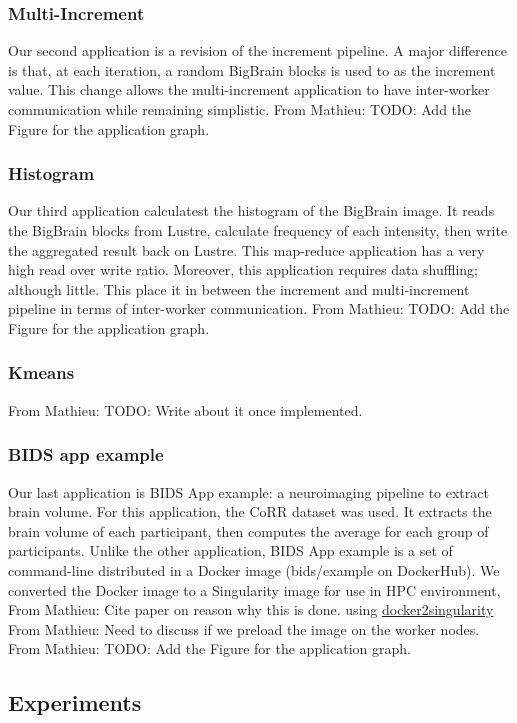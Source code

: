 \documentclass[conference]{IEEEtran}
\newcommand{\MD}[1]{\color{magenta}From Mathieu: #1 \color{black}}
\begin{document}
\subsubsection{Multi-Increment}
Our second application is a revision of the increment pipeline.
A major difference is that, at each iteration, a random BigBrain blocks is used to as the increment value.
This change allows the multi-increment application to have inter-worker communication while remaining simplistic.
\MD{TODO: Add the Figure for the application graph.}

\subsubsection{Histogram}
Our third application calculatest the histogram of the BigBrain image.
It reads the BigBrain blocks from Lustre, calculate frequency of each intensity, then write the aggregated result back on Lustre.
This map-reduce application has a very high read over write ratio.
Moreover, this application requires data shuffling; although little.
This place it in between the increment and multi-increment pipeline in terms of inter-worker communication.
\MD{TODO: Add the Figure for the application graph.}

\subsubsection{Kmeans} %
\MD{TODO: Write about it once implemented.}

\subsubsection{BIDS app example}
Our last application is BIDS App example: a neuroimaging pipeline to extract brain volume.
For this application, the CoRR dataset was used.
It extracts the brain volume of each participant, then computes the average for each group of participants.
Unlike the other application, BIDS App example is a set of command-line distributed in a Docker image (bids/example on DockerHub).
We converted the Docker image to a Singularity image for use in HPC environment, \MD{Cite paper on reason why this is done.}
using \href{https://hub.docker.com/r/singularityware/docker2singularity/tags/}{docker2singularity}
\MD{Need to discuss if we preload the image on the worker nodes.}
\MD{TODO: Add the Figure for the application graph.}

\subsection{Experiments} %
\end{document}
